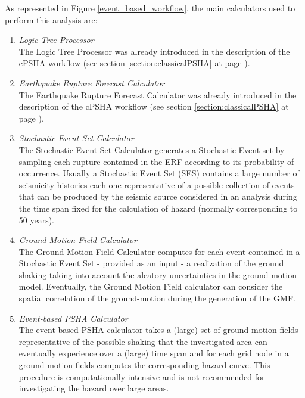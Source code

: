 As represented in Figure \ref{event_based_workflow}, the main calculators 
used to perform this analysis are:
\begin{enumerate}
%
\item \emph{Logic Tree Processor} \hfill \\
The Logic Tree Processor was already 
introduced in the description of the cPSHA workflow (see section 
\ref{section:classicalPSHA} at page \pageref{section:classicalPSHA}).
%
\item \emph{Earthquake Rupture Forecast Calculator} \hfill \\ 
The Earthquake Rupture Forecast Calculator was already 
introduced in the description of the cPSHA workflow (see section 
\ref{section:classicalPSHA} at page \pageref{section:classicalPSHA}).
%
\item \emph{Stochastic Event Set Calculator} \hfill \\
The Stochastic Event Set Calculator generates a Stochastic Event set 
by sampling each rupture contained in the ERF according to its 
probability of occurrence. Usually a Stochastic Event Set (SES) contains
a large number of seismicity histories each one representative of a  
possible collection of events that can be produced by the seismic source
considered in an analysis during the time span fixed for the calculation
of hazard (normally corresponding to 50 years).
%
\item \emph{Ground Motion Field Calculator} \hfill \\
The Ground Motion Field Calculator computes for each event contained in a 
Stochastic Event Set - provided as an input - a realization of the 
ground shaking taking into account the aleatory uncertainties in 
the ground-motion model. Eventually, the Ground Motion Field calculator 
can consider the spatial correlation of the ground-motion during the 
generation of the GMF.
%
\item \emph{Event-based PSHA Calculator} \hfill \\
The event-based PSHA calculator takes a (large) set of ground-motion 
fields representative of the possible shaking that the investigated 
area can eventually experience over a (large) time span and for each 
grid node in a ground-motion fields computes the corresponding hazard 
curve. 
%
This procedure is computationally intensive and is not recommended for 
investigating the hazard over large areas. 
\end{enumerate}

